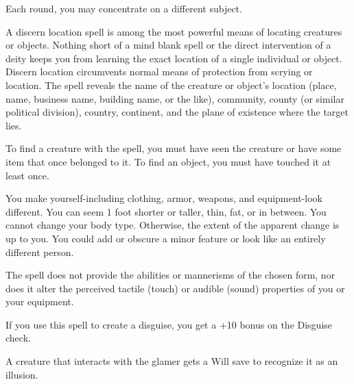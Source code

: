 \begin{multicols}{2}
\begin{small}
\smallskip\noindent Each round, you may concentrate on a different subject.

\noindent A discern location spell is among the most powerful means of locating creatures or objects. Nothing short of a mind blank spell or the direct intervention of a deity keeps you from learning the exact location of a single individual or object. Discern location circumvents normal means of protection from scrying or location. The spell reveals the name of the creature or object's location (place, name, business name, building name, or the like), community, county (or similar political division), country, continent, and the plane of existence where the target lies.

\smallskip\noindent To find a creature with the spell, you must have seen the creature or have some item that once belonged to it. To find an object, you must have touched it at least once.

\noindent You make yourself-including clothing, armor, weapons, and equipment-look different. You can seem 1 foot shorter or taller, thin, fat, or in between. You cannot change your body type. Otherwise, the extent of the apparent change is up to you. You could add or obscure a minor feature or look like an entirely different person.

\smallskip\noindent The spell does not provide the abilities or mannerisms of the chosen form, nor does it alter the perceived tactile (touch) or audible (sound) properties of you or your equipment. 

\smallskip\noindent If you use this spell to create a disguise, you get a +10 bonus on the Disguise check.

\smallskip\noindent A creature that interacts with the glamer gets a Will save to recognize it as an illusion.


\end{small}
\end{multicols}

